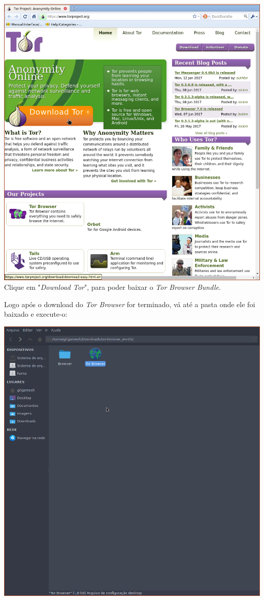 \documentclass[12pt, letterpaper, Monospace:12]{report}
\begin{document}
	\begin{center}
		\includegraphics[scale=0.55]{tbb1.png}\\
		\footnotesize{Clique em "\textit{Download Tor}", para poder baixar o \textit{Tor Browser Bundle}.}
	\end{center}
	
\pagebreak

	Logo após o download do \textit{Tor Browser} for terminado, vá até a pasta onde ele foi baixado e execute-o:

	\begin{center}
		\includegraphics[scale=0.55]{tbb2.png}
	\end{center}
\end{document}
